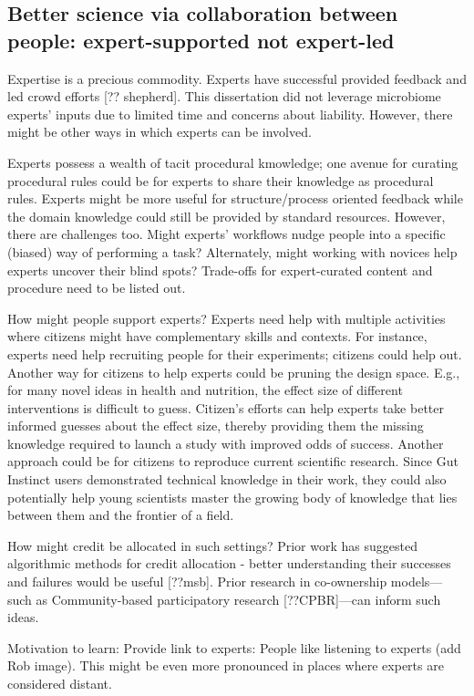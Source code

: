 \subsection{Better science via collaboration between people: expert-supported not expert-led}
Expertise is a precious commodity. Experts have successful provided feedback and led crowd efforts [?? shepherd]. This dissertation did not leverage microbiome experts' inputs due to limited time and concerns about liability. However, there might be other ways in which experts can be involved. 

Experts possess a wealth of tacit procedural kmowledge; one avenue for curating procedural rules could be for experts to share their knowledge as procedural rules.  Experts might be more useful for structure/process oriented feedback while the domain knowledge could still be provided by standard resources. However, there are challenges too. Might experts' workflows nudge people into a specific (biased) way of performing a task? Alternately, might working with novices help experts uncover their blind spots? Trade-offs for expert-curated content and procedure need to be listed out. 

How might people support experts? Experts need help with multiple activities where citizens might have complementary skills and contexts. For instance, experts need help recruiting people for their experiments; citizens could help out.  Another way for citizens to help experts could be pruning the design space. E.g., for many novel ideas in health and nutrition, the effect size of different interventions is difficult to guess. Citizen's efforts can help experts take better informed guesses about the effect size, thereby providing them the missing knowledge required to launch a study with improved odds of success. Another approach could be for citizens to reproduce current scientific research. Since Gut Instinct users demonstrated technical knowledge in their work, they could also potentially help young scientists master the growing body of knowledge that lies between them and the frontier of a field.

How might credit be allocated in such settings? Prior work has suggested algorithmic methods for credit allocation - better understanding their successes and failures would be useful [??msb]. Prior research in co-ownership models---such as Community-based participatory research [??CPBR]---can inform such ideas.

{Motivation to learn: Provide link to experts}: People like listening to experts (add Rob image). This might be even more pronounced in places where experts are considered distant.


